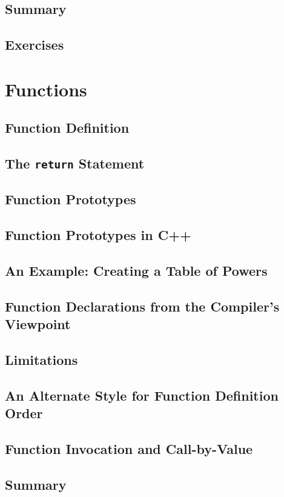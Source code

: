 \documentclass[12pt]{book}
\begin{document}
\section{Summary}
\section{Exercises}

\chapter{Functions}

\section{Function Definition}
\section{The \texttt{return} Statement}
\section{Function Prototypes}
\section{Function Prototypes in C++}
\section{An Example: Creating a Table of Powers}
\section{Function Declarations from the Compiler's Viewpoint}
\section{Limitations}
\section{An Alternate Style for Function Definition Order}
\section{Function Invocation and Call-by-Value}
\section{Summary}
\end{document}

